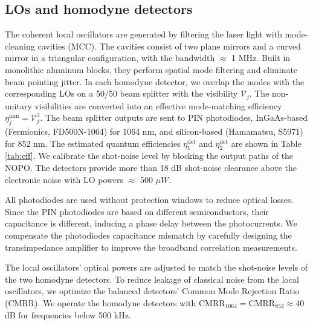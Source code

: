 \documentclass[final,twocolumn,english,prl,notitlepage,nofootinbib,floatfix,longbibliography,superscriptaddress
]{revtex4-2}
\begin{document}
\subsection*{LOs and homodyne detectors}
The coherent local oscillators are generated by filtering the laser light with mode-cleaning cavities (MCC). The cavities consist of two plane mirrors and a curved mirror in a triangular configuration, with the bandwidth $\approx$ 1 MHz. Built in monolithic aluminum blocks, they perform spatial mode filtering and eliminate beam pointing jitter. In each homodyne detector, we overlap the modes with the corresponding LOs on a 50/50 beam splitter with the visibility $\mathcal{V}_j$. The non-unitary visibilities are converted into an effective mode-matching efficiency $\eta_j^{\text{mm}} = \mathcal{V}_j^2$. The beam splitter outputs are sent to  PIN photodiodes, InGaAs-based (Fermionics, FD500N-1064) for 1064 nm, and silicon-based (Hamamatsu, S5971) for 852 nm. The estimated quantum efficiencies $\eta_1^{\mathrm{det}}$ and $\eta_2^{\mathrm{det}}$ are shown in Table \ref{tab:eff}. We calibrate the shot-noise level by blocking the output paths of the NOPO. The detectors provide more than 18 dB shot-noise clearance above the electronic noise with LO powers $\approx$ 500 $\mu W$. \par
All photodiodes are used without protection windows to reduce optical losses. Since the PIN photodiodes are based on different semiconductors, their capacitance is different, inducing a phase delay between the photocurrents. We compensate the photodiodes capacitance mismatch by carefully designing the transimpedance amplifier to improve the broadband correlation measurements.\par
 The local oscillators' optical powers are adjusted to match the shot-noise levels of the two homodyne detectors. To reduce leakage of classical noise from the local oscillators, we optimize the balanced detectors' Common Mode Rejection Ratio (CMRR). We operate the homodyne detectors with $\mathrm{CMRR}_{1064} =\mathrm{CMRR}_{852}\approx40$ dB for frequencies below 500 kHz. 
\end{document}
